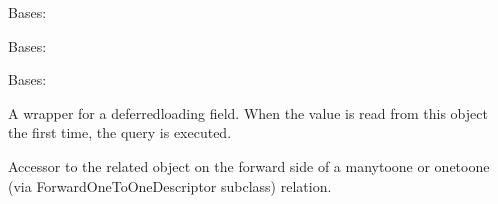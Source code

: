 \documentclass[letterpaper,10pt,english]{sphinxmanual}
\begin{document}
\begin{fulllineitems}
\label{\detokenize{organisations:organisations.models.MemberOrganisation}}
Bases: 

\begin{fulllineitems}
\label{\detokenize{organisations:organisations.models.MemberOrganisation.DoesNotExist}}
Bases: 

\end{fulllineitems}


\begin{fulllineitems}
\label{\detokenize{organisations:organisations.models.MemberOrganisation.MultipleObjectsReturned}}
Bases: 

\end{fulllineitems}


\begin{fulllineitems}
\label{\detokenize{organisations:organisations.models.MemberOrganisation.id}}
A wrapper for a deferred\sphinxhyphen{}loading field. When the value is read from this
object the first time, the query is executed.

\end{fulllineitems}


\begin{fulllineitems}
\label{\detokenize{organisations:organisations.models.MemberOrganisation.member}}
Accessor to the related object on the forward side of a many\sphinxhyphen{}to\sphinxhyphen{}one or
one\sphinxhyphen{}to\sphinxhyphen{}one (via ForwardOneToOneDescriptor subclass) relation.


\end{fulllineitems}
\end{fulllineitems}
\end{document}
